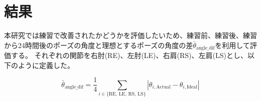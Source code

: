\section{結果}
本研究では練習で改善されたかどうかを評価したいため、練習前、練習後、練習から24時間後のポーズの角度と理想とするポーズの角度の差\(\bar{\theta}_{\text{angle\_dif}}\)を利用して評価する。
それぞれの関節を右肘(RE)、左肘(LE)、右肩(RS)、左肩(LS)とし、以下のように定義した。

\[
  \bar{\theta}_{\text{angle\_dif}} = \frac{1}{4} \sum_{i \in \{\text{RE, LE, RS, LS}\}} |\theta_{i, \text{Actual}} - \theta_{i, \text{Ideal}}|
\]


